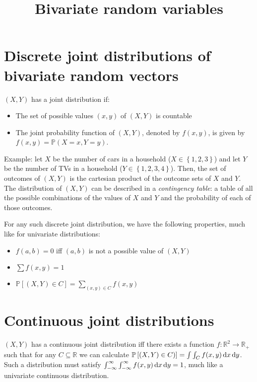 

\title{Bivariate random variables}
\maketitle

\section{Discrete joint distributions of bivariate random vectors}
$(X, Y)$ has a joint distribution if:

\begin{itemize}
\item The set of possible values $(x, y)$ of $(X, Y)$ is countable
\item The joint probability function of $(X, Y)$, denoted by $f(x, y)$, is given by $f(x, y) = \mathbb{P}(X = x, Y = y)$.
\end{itemize}

Example: let $X$ be the number of cars in a household ($X \in \left\{1, 2, 3\right\}$) and let $Y$ be the number of TVs in a household ($Y \in \left\{1, 2, 3, 4\right\}$). Then, the set of outcomes of $(X, Y)$ is the cartesian product of the outcome sets of $X$ and $Y$. The distribution of $(X, Y)$ can be described in a \textit{contingency table}: a table of all the possible combinations of the values of $X$ and $Y$ and the probability of each of those outcomes.

For any such discrete joint distribution, we have the following properties, much like for univariate distributions:

\begin{itemize}
\item $f(a, b) = 0$ iff $(a, b)$ is not a possible value of $(X, Y)$
\item $\sum f(x, y) = 1$
\item $\mathbb{P}\left[(X, Y) \in C\right] = \sum_{(x, y) \in C} f(x, y)$
\end{itemize}

\section{Continuous joint distributions}
$(X, Y)$ has a continuous joint distribution iff there exists a function $f: \mathbb{R}^2 \rightarrow \mathbb{R}_+$ such that for any $C \subseteq \mathbb{R}$ we can calculate $\mathbb{P}\left[(X, Y) \in C)\right] = \int \int_C f(x, y) \mathop{}\!\mathrm{d} x \mathop{}\!\mathrm{d} y$. Such a distribution must satisfy $\int_{-\infty}^{\infty} \int_{-\infty}^{\infty} f(x, y) \mathop{}\!\mathrm{d} x \mathop{}\!\mathrm{d} y = 1$, much like a univariate continuous distribution.

